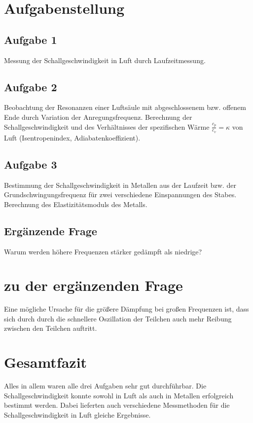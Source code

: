 \documentclass{article}
\begin{document}
{{\newpage
\section{Aufgabenstellung}
\subsection*{Aufgabe 1}
Messung der Schallgeschwindigkeit in Luft durch Laufzeitmessung.
\subsection*{Aufgabe 2}
Beobachtung der Resonanzen einer Luftsäule mit abgeschlossenem bzw. offenem Ende durch Variation der Anregungsfrequenz. Berechnung der Schallgeschwindigkeit und des Verhältnisses der spezifischen Wärme \(\frac{c_{p}}{c_{v}}=\kappa\) von Luft (Isentropenindex, Adiabatenkoeffizient).
\subsection*{Aufgabe 3}
Bestimmung der Schallgeschwindigkeit in Metallen aus der Laufzeit bzw. der Grundschwingungsfrequenz für zwei verschiedene Einspannungen des Stabes. Berechnung des Elastizitätsmoduls des Metalls.
\subsection*{Ergänzende Frage}
Warum werden höhere Frequenzen stärker gedämpft als niedrige?

\newpage





\section{zu der ergänzenden Frage}
Eine mögliche Ursache für die größere Dämpfung bei großen Frequenzen ist, dass sich durch durch die schnellere Oszillation der Teilchen auch mehr Reibung zwischen den Teilchen auftritt.

\section{Gesamtfazit}
Alles in allem waren alle drei Aufgaben sehr gut durchführbar. Die Schallgeschwindigkeit konnte sowohl in Luft als auch in Metallen erfolgreich bestimmt werden. Dabei lieferten auch verschiedene Messmethoden für die Schallgeschwindigkeit in Luft gleiche Ergebnisse.

}}
\end{document}
